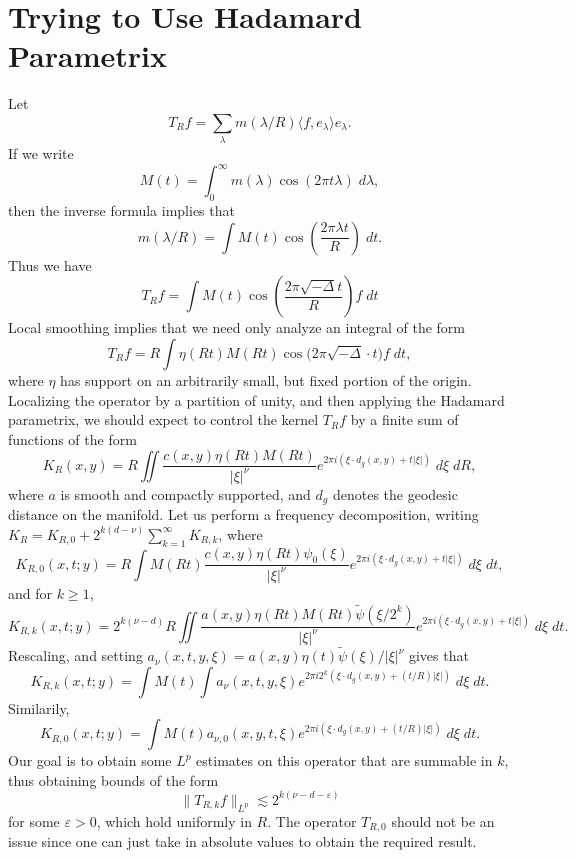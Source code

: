 \chapter{Trying to Use Hadamard Parametrix}

Let
%
\[ T_R f = \sum_\lambda m(\lambda / R) \langle f, e_\lambda \rangle e_\lambda. \]
%
If we write
%
\[ M(t) = \int_0^\infty m(\lambda) \cos(2 \pi t \lambda)\; d\lambda, \]
%
then the inverse formula implies that
%
\[ m(\lambda / R) = \int M(t) \cos \left( \frac{2 \pi \lambda t}{R} \right)\; dt. \]
%
Thus we have
%
\[ T_R f = \int M(t) \cos \left( \frac{2 \pi \sqrt{-\Delta} t}{R} \right) f\; dt \]
%
Local smoothing implies that we need only analyze an integral of the form
%
\[ T_R f = R \int \eta(R t) M(R t) \cos \Big( 2 \pi \sqrt{-\Delta} \cdot t \Big) f\; dt, \]
%
where $\eta$ has support on an arbitrarily small, but fixed portion of the origin. Localizing the operator by a partition of unity, and then applying the Hadamard parametrix, we should expect to control the kernel $T_R f$ by a finite sum of functions of the form
%
\[ K_R(x,y) = R \iint \frac{c(x,y) \eta(R t) M(R t)}{|\xi|^\nu} e^{2 \pi i (\xi \cdot d_g(x,y) + t |\xi|)}\; d\xi\; dR, \]
%
where $a$ is smooth and compactly supported, and $d_g$ denotes the geodesic distance on the manifold. Let us perform a frequency decomposition, writing $K_R = K_{R,0} + 2^{k(d - \nu)} \sum_{k = 1}^\infty K_{R,k}$, where
%
\[ K_{R,0}(x,t;y) = R \int M(Rt) \frac{c(x,y) \eta(R t) \psi_0(\xi)}{|\xi|^\nu} e^{2 \pi i (\xi \cdot d_g(x,y) + t |\xi|)}\; d\xi\; dt, \]
%
and for $k \geq 1$,
%
\[ K_{R,k}(x,t;y) = 2^{k(\nu - d)} R \iint \frac{a(x,y) \eta(R t) M(R t) \tilde{\psi}( \xi / 2^k )}{|\xi|^\nu} e^{2 \pi i (\xi \cdot d_g(x,y) + t |\xi|)}\; d\xi\; dt. \]
%
Rescaling, and setting $a_\nu(x,t,y,\xi) =  a(x,y) \eta(t) \tilde{\psi}(\xi) / |\xi|^\nu$ gives that
%
\[ K_{R,k}(x,t;y) = \int M(t) \int a_\nu(x,t,y,\xi) e^{2 \pi i 2^k (\xi \cdot d_g(x,y) + (t / R) |\xi|)}\; d\xi\; dt. \]
%
Similarily,
%
\[ K_{R,0}(x,t;y) = \int M(t) a_{\nu,0}(x,y,t,\xi) e^{2 \pi i (\xi \cdot d_g(x,y) + (t/R) |\xi|)}\; d\xi\; dt. \]
%
Our goal is to obtain some $L^p$ estimates on this operator that are summable in $k$, thus obtaining bounds of the form
%
\[ \| T_{R,k} f \|_{L^p} \lesssim 2^{k(\nu - d - \varepsilon)} \]
%
for some $\varepsilon > 0$, which hold uniformly in $R$. The operator $T_{R,0}$ should not be an issue since one can just take in absolute values to obtain the required result.


